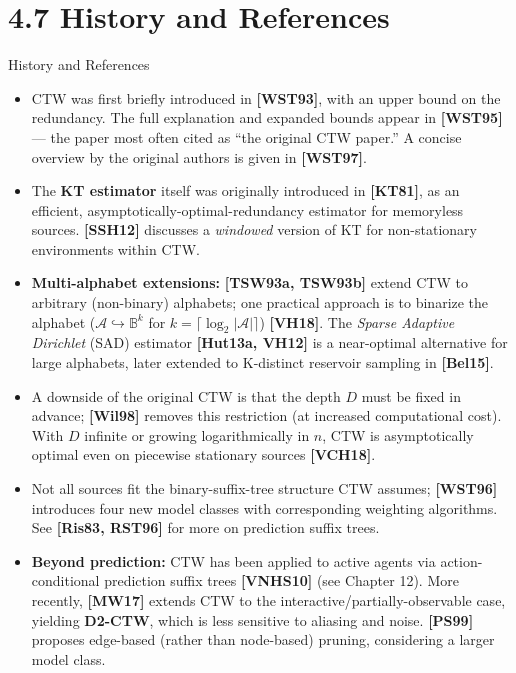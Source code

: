 \documentclass[aspectratio=169,10pt]{beamer}
\begin{document}
\section{4.7 History and References}
\begin{frame}[allowframebreaks]{History and References}
\begin{itemize}
\item CTW was first briefly introduced in \textbf{[WST93]}, with an upper bound on the
redundancy. The full explanation and expanded bounds appear in \textbf{[WST95]} — the paper
most often cited as ``the original CTW paper.'' A concise overview by the original authors
is given in \textbf{[WST97]}.
\item The \textbf{KT estimator} itself was originally introduced in \textbf{[KT81]}, as an
efficient, asymptotically-optimal-redundancy estimator for memoryless sources.
\textbf{[SSH12]} discusses a \emph{windowed} version of KT for non-stationary environments
within CTW.
\item \textbf{Multi-alphabet extensions:} \textbf{[TSW93a, TSW93b]} extend CTW to arbitrary
(non-binary) alphabets; one practical approach is to binarize the alphabet
($\mathcal A\hookrightarrow\mathbb B^k$ for $k=\lceil\log_2|\mathcal A|\rceil$)
\textbf{[VH18]}. The \emph{Sparse Adaptive Dirichlet} (SAD) estimator
\textbf{[Hut13a, VH12]} is a near-optimal alternative for large alphabets, later extended to
K-distinct reservoir sampling in \textbf{[Bel15]}.
\item A downside of the original CTW is that the depth $D$ must be fixed in advance;
\textbf{[Wil98]} removes this restriction (at increased computational cost). With $D$
infinite or growing logarithmically in $n$, CTW is asymptotically optimal even on piecewise
stationary sources \textbf{[VCH18]}.
\item Not all sources fit the binary-suffix-tree structure CTW assumes; \textbf{[WST96]}
introduces four new model classes with corresponding weighting algorithms. See
\textbf{[Ris83, RST96]} for more on prediction suffix trees.
\item \textbf{Beyond prediction:} CTW has been applied to active agents via
action-conditional prediction suffix trees \textbf{[VNHS10]} (see Chapter 12). More
recently, \textbf{[MW17]} extends CTW to the interactive/partially-observable case,
yielding \textbf{D2-CTW}, which is less sensitive to aliasing and noise. \textbf{[PS99]}
proposes edge-based (rather than node-based) pruning, considering a larger model class.

\end{itemize}
\end{frame}
\end{document}
